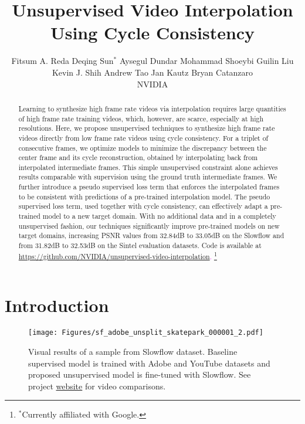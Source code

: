 \documentclass[10pt,twocolumn,letterpaper]{article}
\newcommand\blfootnote[1]{\begingroup
  \renewcommand\thefootnote{}\footnote{#1}\addtocounter{footnote}{-1}\endgroup
}
\begin{document}
\title{Unsupervised Video Interpolation Using Cycle Consistency}

\author{Fitsum A. Reda \quad Deqing Sun$^{*}$ \quad Aysegul Dundar \quad Mohammad Shoeybi \quad Guilin Liu\\ Kevin J. Shih \quad Andrew Tao \quad Jan Kautz \quad Bryan Catanzaro\\
NVIDIA} 

\maketitle
\thispagestyle{empty}


\begin{abstract}

Learning to synthesize high frame rate videos via interpolation requires large quantities of high frame rate training videos, which, however, are scarce, especially at high resolutions. Here, we propose unsupervised techniques to synthesize high frame rate videos directly from low frame rate videos using cycle consistency. For a triplet of consecutive frames, we optimize models to minimize the discrepancy between the center frame and its cycle reconstruction, obtained by interpolating back from interpolated intermediate frames. This simple unsupervised constraint alone achieves results comparable with supervision using the ground truth intermediate frames. We further introduce a pseudo supervised loss term that enforces the interpolated frames to be consistent with predictions of a pre-trained interpolation model. The pseudo supervised loss term, used together with cycle consistency, can effectively adapt a pre-trained model to a new target domain. With no additional data and in a completely unsupervised fashion, our techniques significantly improve pre-trained models on new target domains, increasing PSNR values from 32.84dB to 33.05dB on the Slowflow and from 31.82dB to 32.53dB on the Sintel evaluation datasets. Code is available at \textcolor{magenta}{\href{https://github.com/NVIDIA/unsupervised-video-interpolation}{https://github.com/NVIDIA/unsupervised-video-interpolation}.} \blfootnote{$^*$Currently affiliated with Google.}


\end{abstract}

\section{Introduction}

 \begin{figure}[t]
    \centering
    \texttt{[image: Figures/sf\_adobe\_unsplit\_skatepark\_000001\_2.pdf]}
    \caption{Visual results of a sample from Slowflow dataset. Baseline supervised model is trained with Adobe and YouTube datasets and proposed unsupervised model is fine-tuned with Slowflow. See project \textcolor{magenta}{\href{https://nv-adlr.github.io/publication/2019-UnsupervisedVideoInterpolation}{website}} for video comparisons.}
    \label{fig:Front_page_figure_slowflow}
\end{figure}
\end{document}
